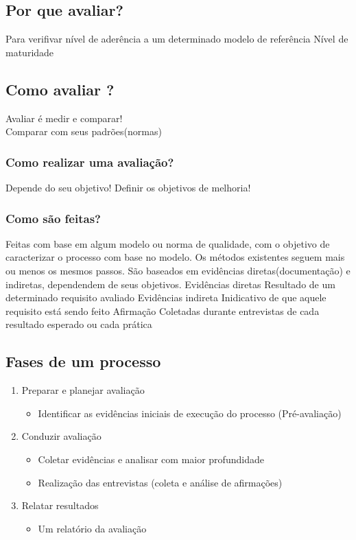 \documentclass{article}
\begin{document}
	
\subsection{Por que avaliar?}
	Para verifivar nível de aderência a um determinado modelo de referência
	Nível de maturidade

\subsection{Como avaliar ?}
	Avaliar é medir e comparar!\\
	Comparar com seus padrões(normas)
	\subsubsection{Como realizar uma avaliação?}
		Depende do seu objetivo!
		Definir os objetivos de melhoria!
	\subsubsection{Como são feitas?}
		Feitas com base em algum modelo ou norma de qualidade, com o objetivo de caracterizar o processo com base no modelo.
		Os métodos existentes seguem mais ou menos os mesmos passos.
		São baseados em evidências diretas(documentação) e indiretas, dependendem de seus objetivos.
		Evidências diretas
			Resultado de um determinado requisito avaliado
		Evidências indireta
			Inidicativo de que aquele requisito está sendo feito
		Afirmação
			Coletadas durante entrevistas de cada resultado esperado ou cada prática
\subsection{Fases de um processo}
	\begin{enumerate}
	
	\item Preparar e planejar avaliação
		\begin{itemize}
		\item Identificar as evidências iniciais de execução do processo (Pré-avaliação)
		\end{itemize}	
	\item Conduzir avaliação
		\begin{itemize}
		\item Coletar evidências e analisar com maior profundidade
		\item Realização das entrevistas (coleta e análise de afirmações)
		\end{itemize}
	\item Relatar resultados
		\begin{itemize}
		\item Um relatório da avaliação
		\end{itemize}
	\end{enumerate}
\end{document}
